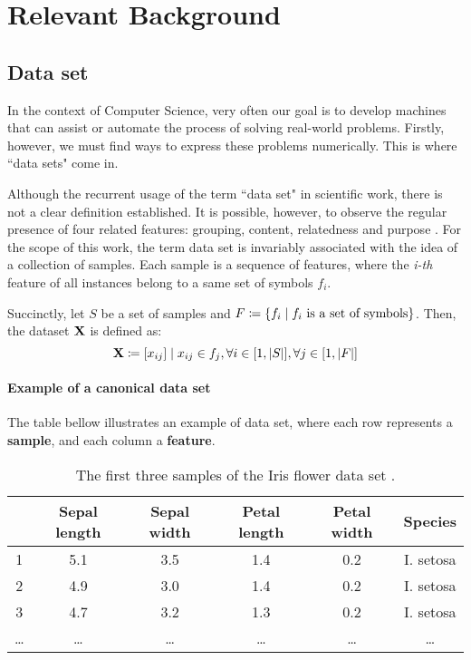 \chapter{Relevant Background}
\section{Data set}

In the context of Computer Science, very often our goal is to develop machines that can assist or automate the process of solving real-world problems. Firstly, however, we must find ways to express these problems numerically. This is where ``data sets" come in.

Although the recurrent usage of the term ``data set" in scientific work, there is not a clear definition established. It is possible, however, to observe the regular presence of four related features: grouping, content, relatedness and purpose \cite{ren2010}.
For the scope of this work, the term data set is invariably associated with the idea of a collection of samples. Each sample is a sequence of features, where the {\em i-th} feature of all instances belong to a same set of symbols $f_i$.

Succinctly, let $S$ be a set of samples and $F \coloneqq  \{f_i \mid f_i \textnormal{ is a set of symbols}\}$.
Then, the dataset $\mathbf{X}$ is defined as:
$$\mathbf{X} \coloneqq [x_{ij}] \mid x_{ij} \in f_j, \forall i \in [1, |S|], \forall j \in [1, |F|]$$

\subsubsection{Example of a canonical data set} \label{irisdataset}

The table bellow illustrates an example of data set, where each row represents a \textbf{sample}, and each column a \textbf{feature}.

\begin{table}[H]
	\begin{tabular}{ c || *{5}{c|}}
		& \textbf{Sepal length} & \textbf{Sepal width} & \textbf{Petal length} & \textbf{Petal width} & \textbf{Species} \\
		\hline
		1 & 5.1	& 3.5 & 1.4 & 0.2 & I. setosa \\
		2 & 4.9 & 3.0 & 1.4 & 0.2 & I. setosa \\
		3 & 4.7 & 3.2 & 1.3 & 0.2 & I. setosa \\
		… & … & … & … & … & … \\
	\end{tabular}
	\caption{The first three samples of the Iris flower data set \cite{lichman2013}.}
\end{table}

